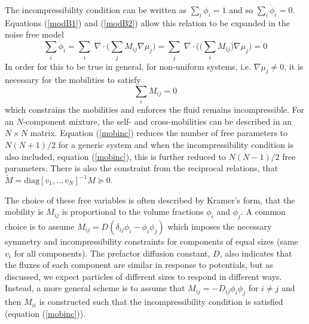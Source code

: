 The incompressibility condition can be written as $\sum_i\phi_i = 1$ and so $\sum_i\dot{\phi}_i = 0$. Equations (\ref{modB1}) and (\ref{modB2}) allow this relation to be expanded in the noise free model
\begin{equation}
    \sum_i\dot{\phi}_i = \sum_i\;\nabla\cdot\bigg(\sum_j M_{ij}\nabla\mu_j\bigg) = \sum_j\;\nabla\cdot\bigg(\big(\sum_i M_{ij}\big)\nabla\mu_j\bigg) = 0
\end{equation}
In order for this to be true in general, for non-uniform systems, i.e. $\nabla\mu_j \neq 0$, it is necessary for the mobilities to satisfy
\begin{equation}
    \sum_i M_{ij} = 0
    \label{mobinc}
\end{equation}
which constrains the mobilities and enforces the fluid remains incompressible. For an $N$-component mixture, the self- and cross-mobilities can be described in an $N\times N$ matrix. Equation (\ref{mobinc}) reduces the number of free parameters to $N(N+1)/2$ for a generic system and when the incompressibility condition is also included, equation (\ref{mobinc}), this is further reduced to $N(N-1)/2$ free parameters. There is also the constraint from the reciprocal relations, that $\widetilde{M} = \text{diag}[v_1, .., v_N]^{-1}M \succcurlyeq 0$.

The choice of these free variables is often described by Kramer's form\cite{KRAMER1984473}, that the mobility is $M_{ij}$ is proportional to the volume fractions $\phi_i$ and $\phi_j$. A common choice is to assume $M_{ij} = D(\delta_{ij}\phi_i - \phi_i\phi_j)$ which imposes the necessary  symmetry and incompressibility constraints for components of equal sizes (same $v_i$ for all components). The prefactor diffusion constant, $D$, also indicates that the fluxes of each component are similar in response to potentials, but as discussed, we expect particles of different sizes to respond in different ways. Instead, a more general scheme is to assume that $M_{ij} = -D_{ij}\phi_i\phi_j$ for $i \neq j$ and then $M_{ii}$ is constructed such that the incompressibility condition is satisfied (equation (\ref{mobinc})).


